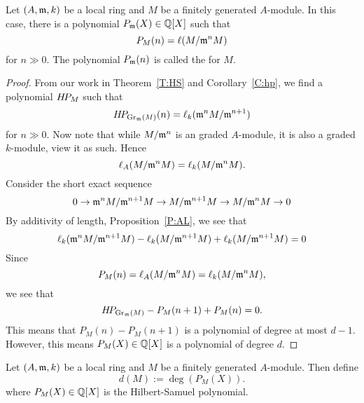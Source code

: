 \documentclass{ximera}
\begin{document}
\begin{theorem}\label{T:S}
  Let $(A,\mathfrak{m},k)$ be a local ring and $M$ be a finitely generated
  $A$-module. In this case, there is a polynomial $P_{\mathfrak{m}}(X)\in\mathbb Q[X]$
  such that
  \[
  P_M(n) = \ell(M/\mathfrak{m}^n M)
  \]
  for $n\gg 0$. The polynomial $P_{\mathfrak{m}}(n)$ is called the  for $M$.
  \begin{proof}
    From our work in Theorem~\ref{T:HS} and Corollary~\ref{C:hp}, we
    find a polynomial $H\!P_M$ such that
    \[
    H\!P_{\operatorname{Gr}_{\mathfrak{m}}(M)}(n) = \ell_{k}(\mathfrak{m}^n M/\mathfrak{m}^{n+1}) 
    \]
    for $n\gg 0$. Now note that while $M/\mathfrak{m}^n$ is an graded
    $A$-module, it is also a graded $k$-module, view it as
    such. Hence
    \[
    \ell_{A}(M/\mathfrak{m}^n M) = \ell_k(M/\mathfrak{m}^n M).
    \]
    Consider the short exact sequence
    \[
    0 \to \mathfrak{m}^n M/\mathfrak{m}^{n+1} M \to M/\mathfrak{m}^{n+1}M \to M/ \mathfrak{m}^n M\to 0
    \]
    By additivity of length, Proposition~\ref{P:AL}, we see that
    \[
    \ell_k(\mathfrak{m}^n M/\mathfrak{m}^{n+1} M) - \ell_k(M/\mathfrak{m}^{n+1}M) + \ell_k(M/\mathfrak{m}^{n+1}M) = 0
    \]
    Since
    \[
    P_M(n) = \ell_{A}(M/\mathfrak{m}^n M) = \ell_k(M/\mathfrak{m}^n M),
    \]
    we see that
    \[
    H\!P_{\operatorname{Gr}_{\mathfrak{m}}(M)} - P_M(n+1) + P_M(n) = 0.
    \]
    This means that $P_M(n)- P_M(n+1)$ is a polynomial of degree at
    most $d-1$. However, this means $P_M(X)\in\mathbb Q[X]$ is a polynomial
    of degree $d$.
  \end{proof}
\end{theorem}



\begin{definition}
  Let $(A,\mathfrak{m},k)$ be a local ring and $M$ be a finitely generated
  $A$-module. Then define
  \[
  d(M) := \deg(P_M(X)).
  \]
  where $P_M(X)\in\mathbb Q[X]$ is the Hilbert-Samuel polynomial.
\end{definition}
\end{document}
